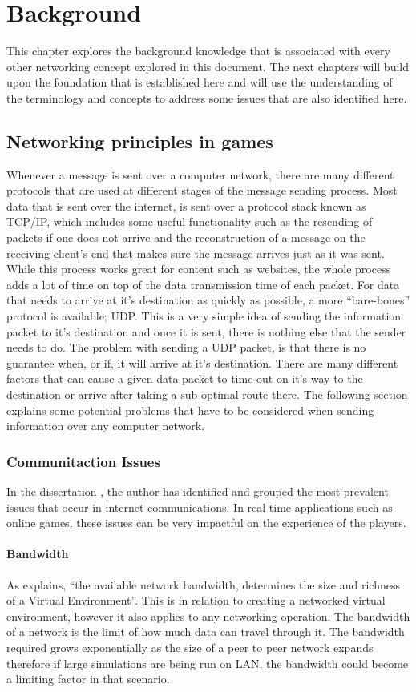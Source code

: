 \chapter{Background}
This chapter explores the background knowledge that is associated with every other networking concept explored in this document. The next chapters will build upon the foundation that is established here and will use the understanding of the terminology and concepts to address some issues that are also identified here.


\section{Networking principles in games}
Whenever a message is sent over a computer network, there are many different protocols that are used at different stages of the message sending process. Most data that is sent over the internet, is sent over a protocol stack known as TCP/IP, which includes some useful functionality such as the resending of packets if one does not arrive and the reconstruction of a message on the receiving client's end that makes sure the message arrives just as it was sent. While this process works great for content such as websites, the whole process adds a lot of time on top of the data transmission time of each packet. For data that needs to arrive at it's destination as quickly as possible, a more ``bare-bones'' protocol is available; UDP. This is a very simple idea of sending the information packet to it's destination and once it is sent, there is nothing else that the sender needs to do. The problem with sending a UDP packet, is that there is no guarantee when, or if, it will arrive at it's destination. There are many different factors that can cause a given data packet to time-out on it's way to the destination or arrive after taking a sub-optimal route there. The following section explains some potential problems that have to be considered when sending information over any computer network.


\subsection{Communitaction Issues}
In the dissertation , the author has identified and grouped the most prevalent issues that occur in internet communications. In real time applications such as online games, these issues can be very impactful on the experience of the players.

\subsubsection{Bandwidth}
As \citeauthor{macedonia1995network} explains, ``the available network bandwidth, determines the size and richness of a Virtual Environment''. This is in relation to creating a networked virtual environment, however it also applies to any networking operation. The bandwidth of a network is the limit of how much data can travel through it. The bandwidth required grows exponentially as the size of a peer to peer network expands therefore if large simulations are being run on LAN, the bandwidth could become a limiting factor in that scenario.

